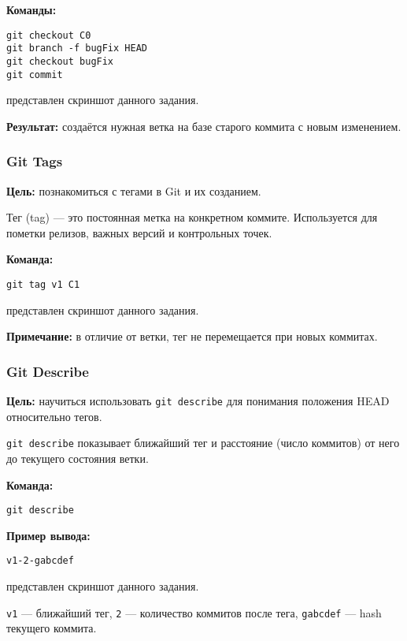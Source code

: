 \documentclass[a4paper,12pt]{report}
\begin{document}
\textbf{Команды:}
\begin{verbatim}
git checkout C0
git branch -f bugFix HEAD
git checkout bugFix
git commit
\end{verbatim}

 представлен скриншот данного задания.

\textbf{Результат:} создаётся нужная ветка на базе старого коммита с новым изменением.

\subsubsection{Git Tags}
\textbf{Цель:} познакомиться с тегами в Git и их созданием.

Тег (tag) — это постоянная метка на конкретном коммите. Используется для пометки релизов, важных версий и контрольных точек.

\textbf{Команда:}
\begin{verbatim}
git tag v1 C1
\end{verbatim}

 представлен скриншот данного задания.

\textbf{Примечание:} в отличие от ветки, тег не перемещается при новых коммитах.

\subsubsection{Git Describe}
\textbf{Цель:} научиться использовать \texttt{git describe} для понимания положения HEAD относительно тегов.

\texttt{git describe} показывает ближайший тег и расстояние (число коммитов) от него до текущего состояния ветки.

\textbf{Команда:}
\begin{verbatim}
git describe
\end{verbatim}

\textbf{Пример вывода:}
\begin{verbatim}
v1-2-gabcdef
\end{verbatim}

 представлен скриншот данного задания.

\texttt{v1} — ближайший тег, \texttt{2} — количество коммитов после тега, \texttt{gabcdef} — hash текущего коммита.
\end{document}
